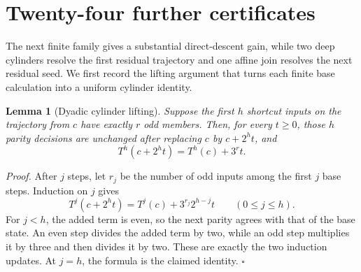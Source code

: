 \documentclass[11pt,letterpaper]{article}
\newtheorem{lemma}[theorem]{Lemma}
\newenvironment{proof}{\noindent\textit{Proof.}}{\hfill\(\square\)}
\begin{document}
\section{Twenty-four further certificates}

The next finite family gives a substantial direct-descent gain, while two
deep cylinders resolve the first residual trajectory and one affine join
resolves the next residual seed. We first record the lifting argument that
turns each finite base calculation into a uniform cylinder identity.

\begin{lemma}[Dyadic cylinder lifting]\label{lem:DyadicLifting}
Suppose the first \(h\) shortcut inputs on the trajectory from \(c\) have
exactly \(r\) odd members. Then, for every \(t\ge0\), those \(h\) parity
decisions are unchanged after replacing \(c\) by \(c+2^ht\), and
\[
T^h(c+2^ht)=T^h(c)+3^rt.
\]
\end{lemma}
\begin{proof}
After \(j\) steps, let \(r_j\) be the number of odd inputs among the first
\(j\) base steps. Induction on \(j\) gives
\[
T^j(c+2^ht)=T^j(c)+3^{r_j}2^{h-j}t
\qquad(0\le j\le h).
\]
For \(j<h\), the added term is even, so the next parity agrees with that of
the base state. An even step divides the added term by two, while an odd
step multiplies it by three and then divides it by two. These are exactly
the two induction updates. At \(j=h\), the formula is the claimed identity.
\end{proof}
\end{document}
